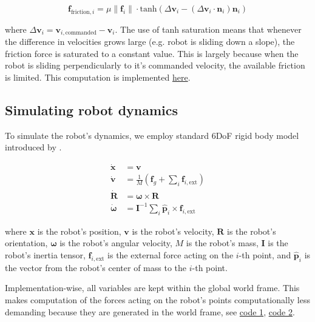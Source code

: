 \documentclass[a4paper,12pt]{article}
\begin{document}
\begin{equation}
  \label{eq:friction_force}
  \mathbf{f}_{\text{friction},i} = \mu \left\| \mathbf{f}_i \right\| \cdot \text{tanh}\left(  \Delta \mathbf{v}_i -  \left( \Delta \mathbf{v}_i\cdot \mathbf{n}_i \right) \mathbf{n}_i \right) 
\end{equation}

where $\Delta \mathbf{v}_i = \mathbf{v}_{i,\text{commanded}} - \mathbf{v}_i$. The use of tanh saturation means that whenever the difference in velocities grows large (e.g. robot is sliding down a slope), the friction force is saturated to a constant value. This is largely because when the robot is sliding perpendicularly to it's commanded velocity, the available friction is limited. This computation is implemented \href{https://github.com/edavidk7/tracked_sim_rl/blob/d7b59702c6411e1dbda3be214524a2e22cceaac6/engine/engine.py#L124}{here}.

\subsection{Simulating robot dynamics}
\label{sec:dynamics}

To simulate the robot's dynamics, we employ standard 6DoF rigid body model introduced by \citet{Agishev_2024}.

\begin{equation}
\label{eq:dynamics}
\begin{aligned}
    \dot{\mathbf{x}} &= \mathbf{v} \\
    \dot{\mathbf{v}} &= \frac{1}{M} \left( \mathbf{f}_g + \sum_i  \mathbf{f}_{i, \text{ext}}  \right)  \\
    \dot{\mathbf{R}} &= \boldsymbol{\omega} \times \mathbf{R} \\
    \dot{\boldsymbol{\omega}} &= \mathbf{I}^{-1} \sum_i \hat{\mathbf{p}}_i\times \mathbf{f}_{i, \text{ext}}
\end{aligned}
\end{equation}

where $\mathbf{x}$ is the robot's position, $\mathbf{v}$ is the robot's velocity, $\mathbf{R}$ is the robot's orientation, $\boldsymbol{\omega}$ is the robot's angular velocity, $M$ is the robot's mass, $\mathbf{I}$ is the robot's inertia tensor, $\mathbf{f}_{i, \text{ext}}$ is the external force acting on the $i$-th point, and $\hat{\mathbf{p}}_i$ is the vector from the robot's center of mass to the $i$-th point.

Implementation-wise, all variables are kept within the global world frame. This makes computation of the forces acting on the robot's points computationally less demanding because they are generated in the world frame,  see \href{https://github.com/edavidk7/tracked_sim_rl/blob/a6cfea8836db27df2154c90051075746729694d0/engine/engine.py#L48-L49}{code 1}, \href{https://github.com/edavidk7/tracked_sim_rl/blob/a6cfea8836db27df2154c90051075746729694d0/engine/engine.py#L65-L73}{code 2}.
\end{document}
